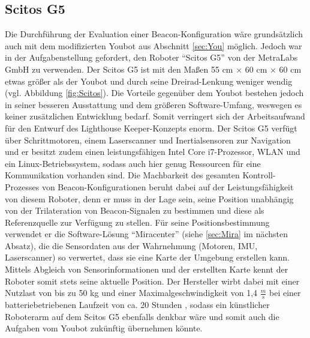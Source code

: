 \subsection{Scitos G5}
Die Durchführung der Evaluation einer Beacon-Konfiguration wäre grundsätzlich auch mit dem modifizierten Youbot aus Abschnitt \ref{sec:You} möglich. Jedoch war in der Aufgabenstellung gefordert, den Roboter "`Scitos G5"' von der MetraLabs GmbH zu verwenden. Der Scitos G5 ist mit den Maßen 55 cm $\times$ 60 cm $\times$ 60 cm etwas größer als der Youbot und durch seine Dreirad-Lenkung weniger wendig (vgl. Abbildung \ref{fig:Scitos}). Die Vorteile gegenüber dem Youbot bestehen jedoch in seiner besseren Ausstattung und dem größeren Software-Umfang, weswegen es keiner zusätzlichen Entwicklung bedarf. Somit verringert sich der Arbeitsaufwand für den Entwurf des Lighthouse Keeper-Konzepts enorm. Der Scitos G5 verfügt über Schrittmotoren, einem Laserscanner und Inertialsensoren zur Navigation und er besitzt zudem einen leistungsfähigen Intel Core i7-Prozessor, WLAN und ein Linux-Betriebssystem, sodass auch hier genug Ressourcen für eine Kommunikation vorhanden sind. Die Machbarkeit des gesamten Kontroll-Prozesses von Beacon-Konfigurationen beruht dabei auf der Leistungsfähigkeit von diesem Roboter, denn er muss in der Lage sein, seine Position unabhängig von der Trilateration von Beacon-Signalen zu bestimmen und diese als Referenzquelle zur Verfügung zu stellen. Für seine Positionsbestimmung verwendet er die Software-Lösung "`Miracenter"' (siehe \ref{sec:Mira} im nächsten Absatz), die die Sensordaten aus der Wahrnehmung (Motoren, IMU, Laserscanner) so verwertet, dass sie eine Karte der Umgebung erstellen kann. Mittels Abgleich von Sensorinformationen und der erstellten Karte kennt der Roboter somit stets seine aktuelle Position. Der Hersteller wirbt dabei mit einer Nutzlast von bis zu 50 kg und einer Maximalgeschwindigkeit von 1,4 $\frac{m}{s}$ bei einer batteriebetriebenen Laufzeit von ca. 20 Stunden \cite{Mira}, sodass ein künstlicher Roboterarm auf dem Scitos G5 ebenfalls denkbar wäre und somit auch die Aufgaben vom Youbot zukünftig übernehmen könnte.
